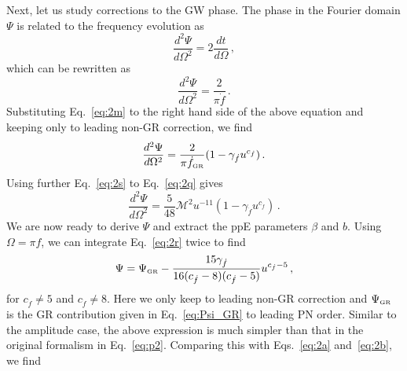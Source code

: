 \documentclass[prd,twocolumn,nofootinbib]{revtex4-1}
\newcommand\be{\begin{equation}}
\newcommand\ee{\end{equation}}
\newcommand{\GR}{{\mbox{\tiny GR}}}
\begin{document}
Next, let us study corrections to the GW phase. The phase in the Fourier domain $\Psi$ is related to the frequency evolution as~\cite{Tichy:1999pv}
\begin{equation}
\frac{d^2\Psi}{d \Omega^2}=2\frac{d t}{d\Omega}\,,
\end{equation}
which can be rewritten as
\begin{equation}
\frac{d^2\Psi}{d \Omega^2}=\frac{2}{\pi \dot{f}}\,.
\end{equation}
Substituting Eq.~\eqref{eq:2m} to the right hand side of the above equation and keeping only to leading non-GR correction, we find 
\begin{equation}\label{eq:2q}
\frac{d^2\Psi}{d \Omega^2}=\frac{2}{\pi\dot{f}_{\GR}}(1-\gamma_{\dot{f}}u^{c_{\dot{f}}})\,.
\end{equation}
Using further Eq.~\eqref{eq:2s} to Eq.~\eqref{eq:2q} gives
\begin{equation}\label{eq:2r}
\frac{d^2\Psi}{d \Omega^2}=\frac{5}{48}\mathcal{M}^2u^{-11}(1-\gamma_{\dot{f}}u^{c_{\dot{f}}})\,.
\end{equation}
We are now ready to derive $\Psi$ and extract the ppE parameters $\beta$ and $b$. Using $\Omega = \pi f$, we can integrate Eq.~\eqref{eq:2r} twice to find 
\be
\label{eq:Psi}
\Psi = \Psi_\GR  -\frac{15 \text{$\gamma_{\dot{f}} $}}{16 (\text{$c_{\dot{f}}$}-8) (\text{$c_{\dot{f}}$}-5)} u^{c_{\dot{f}}-5}\,,
\ee
for $c_{\dot{f}} \neq 5$ and $c_{\dot{f}} \neq 8$. Here we only keep to leading non-GR correction and $\Psi_{\GR}$ is the GR contribution given in Eq.~\eqref{eq:Psi_GR} to leading PN order. Similar to the amplitude case, the above expression is much simpler than that in the original formalism in Eq.~\eqref{eq:p2}.
Comparing this with Eqs.~\eqref{eq:2a} and~\eqref{eq:2b}, we find
\end{document}
